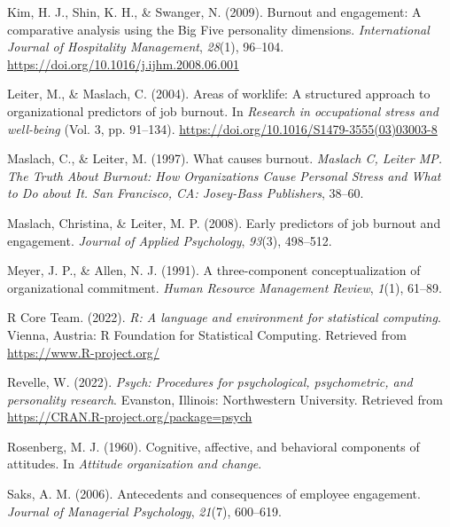 \documentclass[
  man]{apa6}
\newlength{\cslhangindent}
\newlength{\cslentryspacingunit} %
\newenvironment{CSLReferences}[2] %
 {%
  \setlength{\parindent}{0pt}
  \ifodd #1
  \let\oldpar\par
  \def\par{\hangindent=\cslhangindent\oldpar}
  \fi
  \setlength{\parskip}{#2\cslentryspacingunit}
 }%
 {}
\begin{document}
\begin{CSLReferences}{1}{0}
\leavevmode{}%
Kim, H. J., Shin, K. H., \& Swanger, N. (2009). Burnout and engagement: {A} comparative analysis using the {Big} {Five} personality dimensions. \emph{International Journal of Hospitality Management}, \emph{28}(1), 96--104. \url{https://doi.org/10.1016/j.ijhm.2008.06.001}

\leavevmode{}%
Leiter, M., \& Maslach, C. (2004). Areas of worklife: A structured approach to organizational predictors of job burnout. In \emph{Research in occupational stress and well-being} (Vol. 3, pp. 91--134). \url{https://doi.org/10.1016/S1479-3555(03)03003-8}

\leavevmode{}%
Maslach, C., \& Leiter, M. (1997). What causes burnout. \emph{Maslach C, Leiter MP. The Truth About Burnout: How Organizations Cause Personal Stress and What to Do about It. San Francisco, CA: Josey-Bass Publishers}, 38--60.

\leavevmode{}%
Maslach, Christina, \& Leiter, M. P. (2008). Early predictors of job burnout and engagement. \emph{Journal of Applied Psychology}, \emph{93}(3), 498--512.

\leavevmode{}%
Meyer, J. P., \& Allen, N. J. (1991). A three-component conceptualization of organizational commitment. \emph{Human Resource Management Review}, \emph{1}(1), 61--89.

\leavevmode{}%
R Core Team. (2022). \emph{R: A language and environment for statistical computing}. Vienna, Austria: R Foundation for Statistical Computing. Retrieved from \url{https://www.R-project.org/}

\leavevmode{}%
Revelle, W. (2022). \emph{Psych: Procedures for psychological, psychometric, and personality research}. Evanston, Illinois: Northwestern University. Retrieved from \url{https://CRAN.R-project.org/package=psych}

\leavevmode{}%
Rosenberg, M. J. (1960). Cognitive, affective, and behavioral components of attitudes. In \emph{Attitude organization and change}.

\leavevmode{}%
Saks, A. M. (2006). Antecedents and consequences of employee engagement. \emph{Journal of Managerial Psychology}, \emph{21}(7), 600--619.


\end{CSLReferences}
\end{document}
